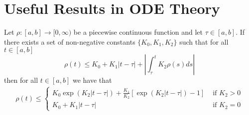\documentclass{unswmaths}
\begin{document}
\setlength\parindent{0pt}
\setlength{\parskip}{5mm plus4mm minus3mm}

\fancyfoot[r]{\today}

\section*{Useful Results in ODE Theory}

\begin{unswlem}
\label{lem:Gronwell_Bellman}
Let $ \rho : [a,b] \longrightarrow [0, \infty) $ be a piecewise continuous function
and let $ \tau \in [a,b] $. If there exists a set of non-negative constants
$ \{ K_0, K_1, K_2 \} $ such that for all $ t \in [a,b] $
$$ \rho(t) \leq K_0 + K_1|t-\tau| + |\int_\tau^t K_2 \rho(s) ds | $$
then for all $ t \in [a,b] $ we have that
\begin{align*}
	\rho(t) \leq 
	\begin{cases}
		K_0\exp(K_2|t-\tau|) + \frac{K_1}{K_2}\left[ \exp(K_2|t-\tau|) - 1 \right] & \text{ if } K_2 > 0 \\
		K_0 + K_1|t-\tau| & \text{ if } K_2 = 0 
	\end{cases}
\end{align*}
\end{unswlem}
\end{document}
